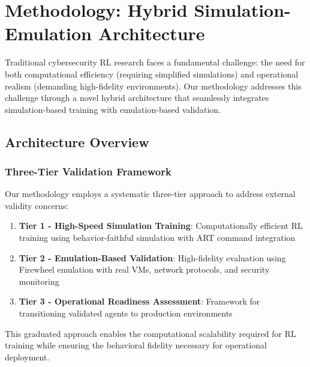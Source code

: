
\section{Methodology: Hybrid Simulation-Emulation Architecture}

Traditional cybersecurity RL research faces a fundamental challenge: the need for both computational efficiency (requiring simplified simulations) and operational realism (demanding high-fidelity environments). Our methodology addresses this challenge through a novel hybrid architecture that seamlessly integrates simulation-based training with emulation-based validation.

\subsection{Architecture Overview}

\subsubsection{Three-Tier Validation Framework}

Our methodology employs a systematic three-tier approach to address external validity concerns:

\begin{enumerate}
    \item \textbf{Tier 1 - High-Speed Simulation Training}: Computationally efficient RL training using behavior-faithful simulation with ART command integration
    
    \item \textbf{Tier 2 - Emulation-Based Validation}: High-fidelity evaluation using Firewheel emulation with real VMs, network protocols, and security monitoring
    
    \item \textbf{Tier 3 - Operational Readiness Assessment}: Framework for transitioning validated agents to production environments
\end{enumerate}

This graduated approach enables the computational scalability required for RL training while ensuring the behavioral fidelity necessary for operational deployment.


